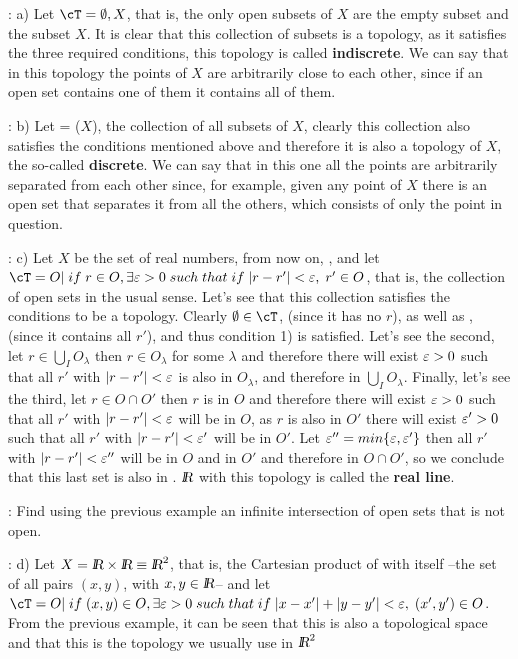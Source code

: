 \ejem: a) Let $\cT = {\emptyset, X}$, that is, the only open subsets of $X$ are the empty subset and the subset $X$. It is clear that this collection of subsets is a topology, as it satisfies the three required conditions, this topology is called {\bf indiscrete}. We can say that in this topology the points of $X$ are arbitrarily close to each other, since if an open set contains one of them it contains all of them.

\ejem: b) Let \cT = \cP($X$), the collection of all subsets of $X$, clearly this collection also satisfies the conditions mentioned above and therefore it is also a topology of $X$, the so-called {\bf discrete}. We can say that in this one all the points are arbitrarily separated from each other since, for example, given any point of $X$ there is an open set that separates it from all the others, which consists of only the point in question.

\ejem: c) Let $X$ be the set of real numbers, from now on, \re, and let \\
$\cT = {O |\; if \;r \in O, \exists \eps >0 \; such \; that \;if \; |r - r'| < \eps, \; r' \in O}$, that is, the collection of open sets in the usual sense. Let's see that this collection satisfies the conditions to be a topology. Clearly $\emptyset \in \cT$, (since it has no $r$), as well as \re, (since it contains all $r'$), and thus condition 1) is satisfied. Let's see the second, let $r \in \bigcup_I O_{\lambda}$ then $r \in O_{\lambda}$ for some $\lambda$ and therefore there will exist $\mbox{$\varepsilon$} >0 $ such that all $r'$ with $|r-r'| < \mbox{$\varepsilon$} $ is also in $O_{\lambda}$, and therefore in $\bigcup_I O_{\lambda}$. 
Finally, let's see the third, let $r \in O \cap O'$ then $r$ is in $O$ and therefore there will exist $\mbox{$\varepsilon$} > 0$ such that all $r'$ with $|r-r'| < \mbox{$\varepsilon$} $ will be in $O$, as $r$ is also in $O'$ there will exist $\mbox{$\varepsilon$}'> 0$ such that all $r'$ with $|r-r'| < \mbox{$\varepsilon$}'$ will be in $O'$. 
Let $\mbox{$\varepsilon$}'' = min\{\mbox{$\varepsilon$}, \mbox{$\varepsilon$}' \}$ then all $r'$ with $|r-r'| < \mbox{$\varepsilon$}''$ will be in $O$ and in $O'$ and therefore in $O \cap O'$, so we conclude that this last set is also in \cT. $\mbox{\sl {l$\!\!\!\;\:\!$R}}$ with this topology is called the {\bf real line}.

\ejer: Find using the previous example an infinite intersection of open sets that is not open.

\ejem: d) Let $X = \re \times \re \equiv \re^2$, that is, the Cartesian product of \re with itself --the set of all pairs $(x,y)$, with $x,y \in \mbox{\sl {l$\!\!\!\;\:\!$R}}$-- and let \\
$\cT = {O |\; if \; (x,y) \in O, \exists \eps >0 \; such \; that \; if \; |x - x'|+|y-y'| < \eps, \; (x',y') \in O}$. From the previous example, it can be seen that this is also a topological space and that this is the topology we usually use in $\mbox{\sl {l$\!\!\!\;\:\!$R}}^2$

